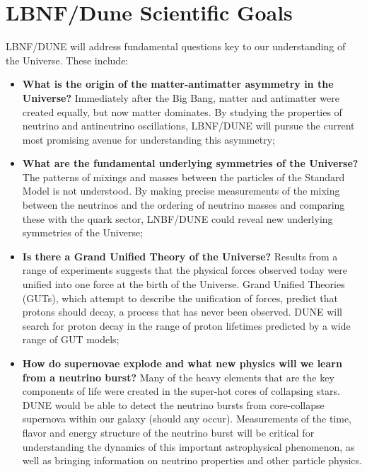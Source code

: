 \chapter{LBNF/Dune Scientific Goals}
\label{ch:physics-goals}

LBNF/DUNE will address fundamental questions key to our understanding of the Universe. These include:
\begin{itemize}
   \item {\bf What is the origin of the matter-antimatter asymmetry in the Universe?} Immediately after
                    the Big Bang, matter and antimatter were created equally, but now matter dominates.
                    By studying the properties of neutrino and antineutrino oscillations, LBNF/DUNE 
                    will pursue the current most promising avenue for understanding this asymmetry;
   \item {\bf What are the fundamental underlying symmetries of the Universe?} The patterns of mixings and masses between the particles of the Standard Model is not understood. By making precise measurements of the mixing between the neutrinos and the ordering of neutrino masses and comparing these with the quark sector, LNBF/DUNE could reveal new underlying symmetries of the Universe;
  \item{\bf  Is there a Grand Unified Theory of the Universe?} Results from a range of experiments suggests that the
                 physical forces observed today were unified into one force at the birth of the Universe.
                Grand Unified Theories (GUTs), which attempt to describe the unification of forces,
                predict that protons should decay, a process that has never been observed. DUNE will 
                search for proton decay in the range of proton lifetimes predicted by a wide range of GUT models;
   \item{\bf How do supernovae explode and what new physics will we learn from a neutrino burst?}
   Many of the heavy elements that are the key components of life were created in the super-hot cores of collapsing stars. DUNE would be able to detect the neutrino bursts from core-collapse supernova within our galaxy (should any occur). Measurements of the time, flavor and energy structure of the neutrino burst will be critical for understanding the dynamics of this important astrophysical phenomenon, as well as bringing information on neutrino properties and other particle physics.
\end{itemize}

